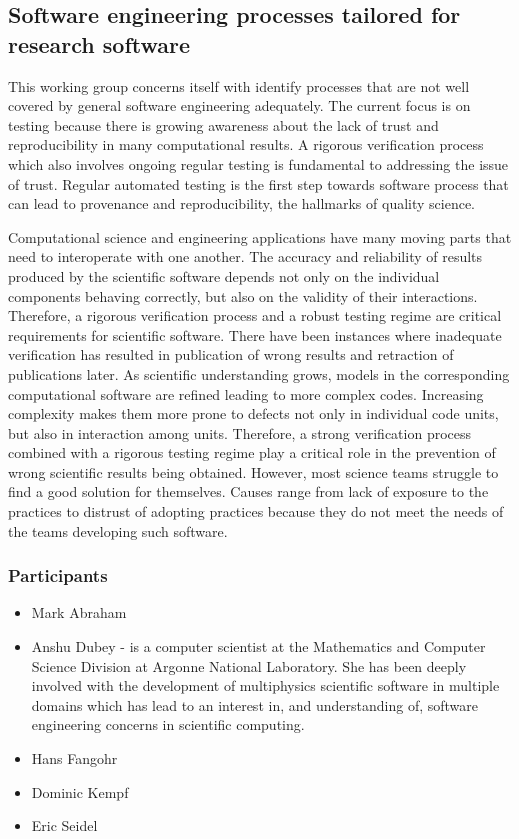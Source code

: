 \subsection{Software engineering processes tailored for research software}
\label{sec:soft-eng}


This working group concerns itself with identify processes that are not well
covered by general software engineering adequately. The current focus
is on testing because there is growing awareness about the lack of trust
and reproducibility in many computational results. A rigorous
verification process which also involves ongoing regular testing is
fundamental to addressing the issue of trust. Regular automated
testing is the first step towards software process that can lead to
provenance and reproducibility, the hallmarks of quality science.

Computational science and engineering applications have many moving
parts that need to interoperate with one another. The accuracy and
reliability of results produced by the scientific software depends not
only on the individual components behaving correctly, but also on the
validity of their interactions. Therefore, a rigorous verification
process and a robust testing regime are critical requirements for
scientific software.  There have been instances where inadequate
verification has resulted in publication of wrong results and
retraction of publications later. As scientific understanding grows,
models in the corresponding computational software are refined leading
to more complex codes. Increasing complexity makes them more prone to
defects not only in individual code units, but also in interaction
among units. Therefore, a strong verification process combined with a
rigorous testing regime play a critical role in the prevention of
wrong scientific results being obtained. However, most science teams
struggle to find a good solution for themselves. Causes range from
lack of exposure to the practices to distrust of adopting practices
because they do not meet the needs of the teams developing such
software.  

\subsubsection{Participants}
\begin{itemize}
\item Mark Abraham
\item Anshu Dubey - is a computer scientist at the Mathematics and
  Computer Science Division at Argonne National Laboratory. She has
  been deeply involved with the development of multiphysics scientific
  software in multiple domains which has lead to an interest in, and
  understanding of, software engineering concerns in scientific
  computing. 
\item Hans Fangohr
\item Dominic Kempf
\item Eric Seidel
\end{itemize}

